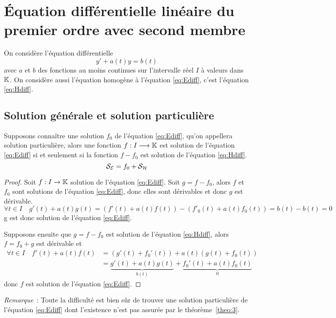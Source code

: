 \section{Équation différentielle linéaire du premier ordre avec second membre}
\label{sec:equadifflinpremierordresecondmembre}
On considère l'équation différentielle
\begin{equation}
y'+a(t)y=b(t) \label{eq:Ediff}
\end{equation}
avec $a$ et $b$ des fonctions au moins continues sur l'intervalle réel $I$ à valeurs dans $\mathbb{K}$.
On considère aussi l'équation homogène à l'équation \eqref{eq:Ediff}, c'est l'équation \eqref{eq:Hdiff}.
\subsection{Solution générale et solution particulière}
\label{subsec:solutiongeneraleetpart}
\begin{theo}\label{theo:3}
Supposons connaître une solution $f_0$ de l'équation \eqref{eq:Ediff}, qu'on appellera solution particulière, alors une fonction $f:I \longrightarrow \mathbb{K}$ est solution de l'équation \eqref{eq:Ediff} si et seulement si la fonction $f-f_0$ est solution de l'équation \eqref{eq:Hdiff}.
\begin{equation}
\mathcal{S}_{\mathcal{E}}=f_0 + \mathcal{S}_{\mathcal{H}}
\end{equation}
\end{theo}
\begin{proof}
  Soit $f:I \rightarrow \mathbb{K}$ solution de l'équation \eqref{eq:Ediff}. Soit $g=f-f_0$, alors $f$ et $f_0$ sont solutions de l'équation \eqref{eq:Ediff}, donc elles sont dérivables et donc $g$ est dérivable.
  \begin{equation}
    \forall t \in I \quad g'(t)+a(t)g(t)=(f'(t)+a(t)f(t))-(f'_0(t)+a(t)f_0(t))=b(t)-b(t)=0
  \end{equation}
g est donc solution de l'équation \eqref{eq:Ediff}.

Supposons ensuite que $g=f-f_0$ est solution de l'équation \eqref{eq:Hdiff}, alors $f=f_0+g$ est dérivable et
\begin{align}
  \forall t \in I \quad f'(t)+a(t)f(t)&=(g'(t)+f_0'(t)) + a(t)(g(t)+f_0(t)) \\ &=\underbrace{g'(t)+a(t)g(t)}_{b(t)} + \underbrace{f_0'(t)+a(t)f_0(t)}_{0}
\end{align}
donc $f$ est solution de l'équation \eqref{eq:Ediff}.
\end{proof}

\emph{Remarque}~: Toute la difficulté est bien sûr de trouver une solution particulière de l'équation \eqref{eq:Ediff} dont l'existence n'est pas assurée par le théorème~\ref{theo:3}.


